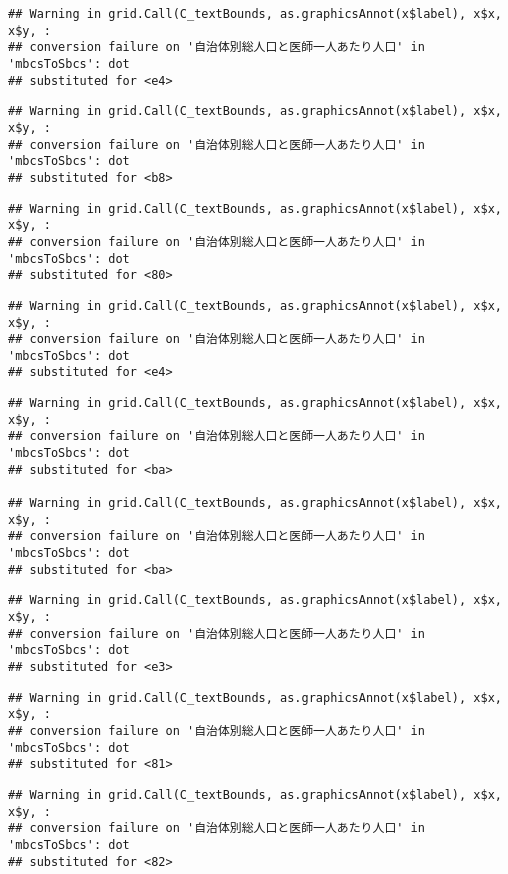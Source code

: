 \documentclass[
]{article}
\begin{document}
\begin{verbatim}
## Warning in grid.Call(C_textBounds, as.graphicsAnnot(x$label), x$x, x$y, :
## conversion failure on '自治体別総人口と医師一人あたり人口' in 'mbcsToSbcs': dot
## substituted for <e4>
\end{verbatim}

\begin{verbatim}
## Warning in grid.Call(C_textBounds, as.graphicsAnnot(x$label), x$x, x$y, :
## conversion failure on '自治体別総人口と医師一人あたり人口' in 'mbcsToSbcs': dot
## substituted for <b8>
\end{verbatim}

\begin{verbatim}
## Warning in grid.Call(C_textBounds, as.graphicsAnnot(x$label), x$x, x$y, :
## conversion failure on '自治体別総人口と医師一人あたり人口' in 'mbcsToSbcs': dot
## substituted for <80>
\end{verbatim}

\begin{verbatim}
## Warning in grid.Call(C_textBounds, as.graphicsAnnot(x$label), x$x, x$y, :
## conversion failure on '自治体別総人口と医師一人あたり人口' in 'mbcsToSbcs': dot
## substituted for <e4>
\end{verbatim}

\begin{verbatim}
## Warning in grid.Call(C_textBounds, as.graphicsAnnot(x$label), x$x, x$y, :
## conversion failure on '自治体別総人口と医師一人あたり人口' in 'mbcsToSbcs': dot
## substituted for <ba>

## Warning in grid.Call(C_textBounds, as.graphicsAnnot(x$label), x$x, x$y, :
## conversion failure on '自治体別総人口と医師一人あたり人口' in 'mbcsToSbcs': dot
## substituted for <ba>
\end{verbatim}

\begin{verbatim}
## Warning in grid.Call(C_textBounds, as.graphicsAnnot(x$label), x$x, x$y, :
## conversion failure on '自治体別総人口と医師一人あたり人口' in 'mbcsToSbcs': dot
## substituted for <e3>
\end{verbatim}

\begin{verbatim}
## Warning in grid.Call(C_textBounds, as.graphicsAnnot(x$label), x$x, x$y, :
## conversion failure on '自治体別総人口と医師一人あたり人口' in 'mbcsToSbcs': dot
## substituted for <81>
\end{verbatim}

\begin{verbatim}
## Warning in grid.Call(C_textBounds, as.graphicsAnnot(x$label), x$x, x$y, :
## conversion failure on '自治体別総人口と医師一人あたり人口' in 'mbcsToSbcs': dot
## substituted for <82>
\end{verbatim}
\end{document}
